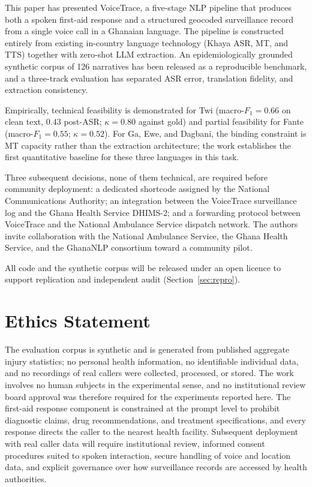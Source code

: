 \documentclass[conference]{IEEEtran}
\begin{document}
This paper has presented VoiceTrace, a five-stage NLP pipeline that
produces both a spoken first-aid response and a structured geocoded
surveillance record from a single voice call in a Ghanaian language.
The pipeline is constructed entirely from existing in-country
language technology (Khaya ASR, MT, and TTS) together with zero-shot
LLM extraction. An epidemiologically grounded synthetic corpus of
126 narratives has been released as a reproducible benchmark, and a
three-track evaluation has separated ASR error, translation
fidelity, and extraction consistency.

Empirically, technical feasibility is demonstrated for Twi
(macro-$F_{1} = 0.66$ on clean text, $0.43$ post-ASR;
$\kappa = 0.80$ against gold) and partial feasibility for Fante
(macro-$F_{1} = 0.55$; $\kappa = 0.52$). For Ga, Ewe, and Dagbani,
the binding constraint is MT capacity rather than the extraction
architecture; the work establishes the first quantitative baseline
for these three languages in this task.

Three subsequent decisions, none of them technical, are required
before community deployment: a dedicated shortcode assigned by the
National Communications Authority; an integration between the
VoiceTrace surveillance log and the Ghana Health Service DHIMS-2;
and a forwarding protocol between VoiceTrace and the National
Ambulance Service dispatch network. The authors invite collaboration
with the National Ambulance Service, the Ghana Health Service, and
the GhanaNLP consortium toward a community pilot.

All code and the synthetic corpus will be released under an open
licence to support replication and independent audit
(Section~\ref{sec:repro}).


\section*{Ethics Statement}

The evaluation corpus is synthetic and is generated from published
aggregate injury statistics; no personal health information, no
identifiable individual data, and no recordings of real callers were
collected, processed, or stored. The work involves no human subjects
in the experimental sense, and no institutional review board approval
was therefore required for the experiments reported here. The
first-aid response component is constrained at the prompt level to
prohibit diagnostic claims, drug recommendations, and treatment
specifications, and every response directs the caller to the nearest
health facility. Subsequent deployment with real caller data will
require institutional review, informed consent procedures suited to
spoken interaction, secure handling of voice and location data, and
explicit governance over how surveillance records are accessed by
health authorities.
\end{document}
